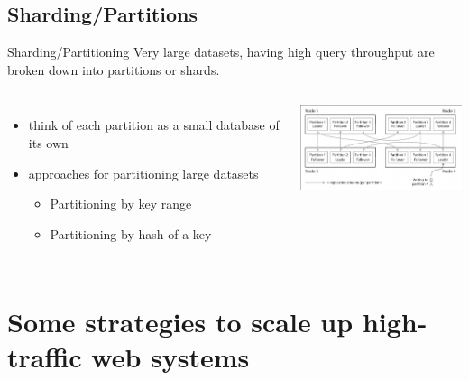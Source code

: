 \documentclass[9pt]{beamer}
\begin{document}
\subsection{Sharding/Partitions}
\begin{frame}{Sharding/Partitioning}
  Very large datasets, having high query throughput are broken down into partitions or shards.

  \pause
  \begin{columns}
    \begin{itemize}
    \item think of each partition as a small database of its own
    \item approaches for partitioning large datasets
      \begin{itemize}
        \item Partitioning by key range
        \item Partitioning by hash of a key
      \end{itemize}
    \end{itemize}
    
    \pause
    \includegraphics[width=55mm, height=25mm, scale=0.1]{img/shard_replica.png}
  \end{columns}
\end{frame}


\section{Some strategies to scale up high-traffic web systems}

\end{document}
